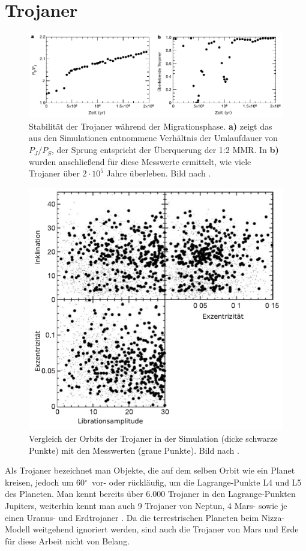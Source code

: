 \documentclass[12pt,a4paper,twoside,open=right,bibliography=totoc]{scrbook}
\renewcommand{\cite}{ \citep}
\newcommand{\degree}{$^\circ$}
\begin{document}
\FloatBarrier
\section{Trojaner}\label{Trojaner}
\newcommand{\PJS}{P_J/P_S}

\begin{figure}
\centering 
\includegraphics[scale=1]{img/Morbidelli2005-1v}
\caption{Stabilität der Trojaner während der Migrationsphase. \textbf{a)} zeigt das aus den Simulationen entnommene Verhältnis der Umlaufdauer von $\PJS$, der Sprung entspricht der Überquerung der 1:2 MMR. In \textbf{b)} wurden anschließend für diese Messwerte ermittelt, wie viele Trojaner über $2\cdot10^5$ Jahre überleben. Bild nach \cite{Morbidelli2005}.}
\label{fig:Trojanerstabilitaet}
\end{figure}
\begin{figure}
\centering 
\includegraphics[scale=1]{img/Morbidelli2005-2}
\caption{Vergleich der Orbits der Trojaner in der Simulation (dicke schwarze Punkte) mit den Messwerten (graue Punkte). Bild nach \cite{Morbidelli2005}.}
\label{fig:Trojanerorbitale}
\end{figure}
Als Trojaner bezeichnet man Objekte, die auf dem selben Orbit wie ein Planet kreisen, jedoch um 60\degree\ vor- oder rückläufig, um die Lagrange-Punkte L4 und L5 des Planeten. 
Man kennt bereits über 6.000 Trojaner in den Lagrange-Punkten Jupiters, weiterhin kennt man auch 9 Trojaner von Neptun, 4 Mars- sowie je einen Uranus- und Erdtrojaner\cite{IAU14}.
Da die terrestrischen Planeten beim Nizza-Modell weitgehend ignoriert werden, sind auch die Trojaner von Mars und Erde für diese Arbeit nicht von Belang.
\end{document}
